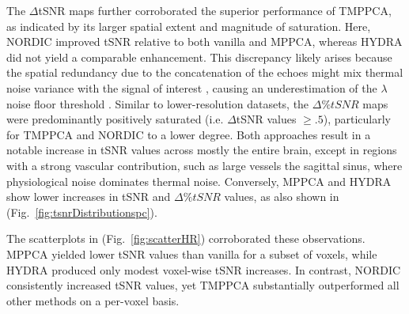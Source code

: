 The $\Delta$tSNR maps further corroborated the superior performance of TMPPCA, as indicated by its larger spatial extent and magnitude of saturation. Here, NORDIC improved tSNR relative to both vanilla and MPPCA, whereas HYDRA did not yield a comparable enhancement. This discrepancy likely arises because the spatial redundancy due to the concatenation of the echoes might mix thermal noise variance with the signal of interest \citep{fernandesMPPCADenoisingFMRI2023a}, causing an underestimation of the $\lambda$ noise floor threshold \citep{manzanopatronDenoisingDiffusionMRI2024}. Similar to lower-resolution datasets, the $\Delta\%tSNR$ maps were predominantly positively saturated (i.e. $\Delta$tSNR values $\geqslant.5$), particularly for TMPPCA and NORDIC to a lower degree. Both approaches result in a notable increase in tSNR values across mostly the entire brain, except in regions with a strong vascular contribution, such as large vessels the sagittal sinus, where physiological noise dominates thermal noise. Conversely, MPPCA and HYDRA show lower increases in tSNR and $\Delta\%tSNR$ values, as also shown in (Fig.~\ref{fig:tsnrDistributionspc}).

The scatterplots in (Fig.~\ref{fig:scatterHR}) corroborated these observations. MPPCA yielded lower tSNR values than vanilla for a subset of voxels, while HYDRA produced only modest voxel-wise tSNR increases. In contrast, NORDIC consistently increased tSNR values, yet TMPPCA substantially outperformed all other methods on a per-voxel basis. 

